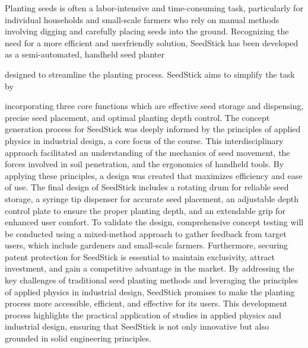 Planting seeds is often a labor-intensive and time-consuming task, particularly for individual
households and small-scale farmers who rely on manual methods involving digging and
carefully placing seeds into the ground. Recognizing the need for a more efficient and userfriendly
solution,
SeedStick
has
been
developed
as
a
semi-automated,
handheld
seed
planter

designed
to
streamline
the
planting
process.
SeedStick
aims
to
simplify
the
task
by

incorporating
three
core
functions
which
are
effective
seed
storage
and
dispensing,
precise
seed
placement,
and optimal planting depth control. The concept generation process for
SeedStick was deeply informed by the principles of applied physics in industrial design, a core
focus of the course. This interdisciplinary approach facilitated an understanding of the
mechanics of seed movement, the forces involved in soil penetration, and the ergonomics of
handheld tools. By applying these principles, a design was created that maximizes efficiency
and ease of use. The final design of SeedStick includes a rotating drum for reliable seed
storage, a syringe tip dispenser for accurate seed placement, an adjustable depth control plate
to ensure the proper planting depth, and an extendable grip for enhanced user comfort. To
validate the design, comprehensive concept testing will be conducted using a mixed-method
approach to gather feedback from target users, which include gardeners and small-scale
farmers. Furthermore, securing patent protection for SeedStick is essential to maintain
exclusivity, attract investment, and gain a competitive advantage in the market. By addressing
the key challenges of traditional seed planting methods and leveraging the principles of
applied physics in industrial design, SeedStick promises to make the planting process more
accessible, efficient, and effective for its users. This development process highlights the
practical application of studies in applied physics and industrial design, ensuring that SeedStick
is not only innovative but also grounded in solid engineering principles. 
